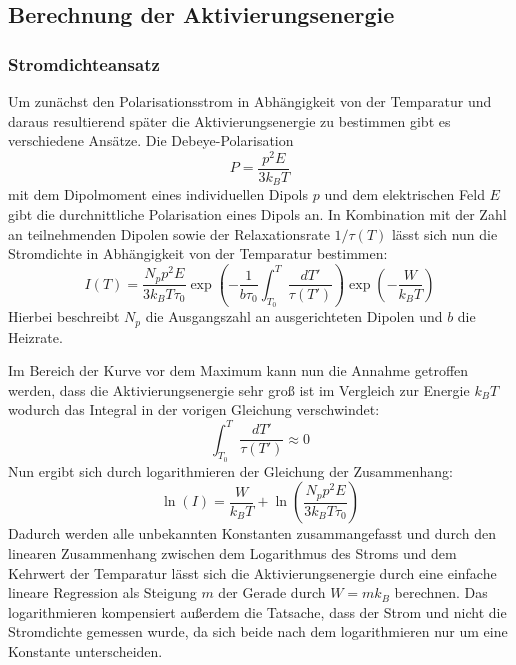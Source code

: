 \subsection{Berechnung der Aktivierungsenergie}
\subsubsection{Stromdichteansatz}
Um zunächst den Polarisationsstrom in Abhängigkeit von der Temparatur und daraus resultierend später die Aktivierungsenergie zu bestimmen gibt es verschiedene Ansätze. Die Debeye-Polarisation
\begin{equation*}
P=\frac{p^2E}{3k_BT}
\end{equation*}
mit dem Dipolmoment eines individuellen Dipols $p$ und dem elektrischen Feld $E$ gibt die durchnittliche Polarisation eines Dipols an. In Kombination mit der Zahl an teilnehmenden Dipolen sowie der Relaxationsrate $1/\tau(T)$ lässt sich nun die Stromdichte in Abhängigkeit von der Temparatur bestimmen:
\begin{equation}
I(T)=\frac{N_pp^2E}{3k_BT\tau_0}\exp \left( -\frac{1}{b\tau_0}\int^{T}_{T_0} \frac{dT'}{\tau(T')}\right)\exp\left(-\frac{W}{k_BT}\right)
\label{eq:IStromdichteansatz}
\end{equation}
Hierbei beschreibt $N_p$ die Ausgangszahl an ausgerichteten Dipolen und $b$ die Heizrate. 

Im Bereich der Kurve vor dem Maximum kann nun die Annahme getroffen werden, dass die Aktivierungsenergie sehr groß ist im Vergleich zur Energie $k_BT$ wodurch das Integral in der vorigen Gleichung verschwindet:
\begin{equation*}
 \int^{T}_{T_0} \frac{dT'}{\tau(T')}\approx 0
\end{equation*}
Nun ergibt sich durch logarithmieren der Gleichung der Zusammenhang:
\begin{equation}
\ln(I)=\frac{W}{k_BT}+\ln\left(\frac{N_pp^2E}{3k_BT\tau_0}\right)
\end{equation}
Dadurch werden alle unbekannten Konstanten zusammangefasst und durch den linearen Zusammenhang zwischen dem Logarithmus des Stroms und dem Kehrwert der Temparatur lässt sich die Aktivierungsenergie durch eine einfache lineare Regression als Steigung $m$ der Gerade durch $W=mk_B$ berechnen. Das logarithmieren kompensiert außerdem die Tatsache, dass der Strom und nicht die Stromdichte gemessen wurde, da sich beide nach dem logarithmieren nur um eine Konstante unterscheiden.
